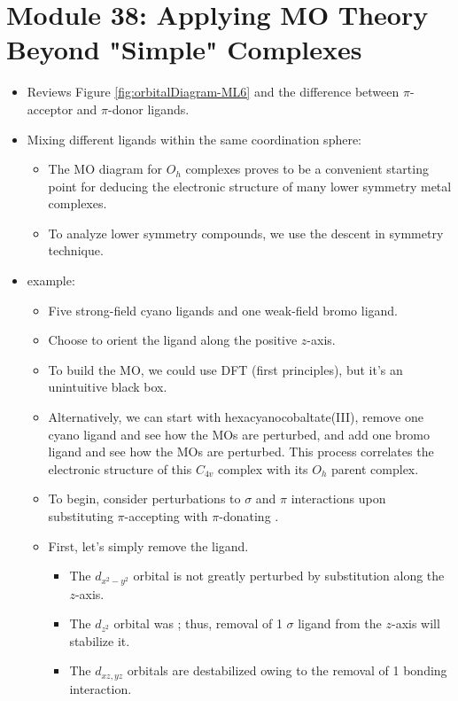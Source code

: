 \documentclass[../notes.tex]{subfiles}
\begin{document}
\section{Module 38: Applying MO Theory Beyond "Simple"  Complexes}
\begin{itemize}
    \item {}Reviews Figure \ref{fig:orbitalDiagram-ML6} and the difference between $\pi$-acceptor and $\pi$-donor ligands.
    \item Mixing different ligands within the same coordination sphere:
    \begin{itemize}
        \item The MO diagram for $O_h$ complexes proves to be a convenient starting point for deducing the electronic structure of many lower symmetry metal complexes.
        \item To analyze lower symmetry compounds, we use the descent in symmetry technique.
    \end{itemize}
    \item {} example:
    \begin{itemize}
        \item Five strong-field cyano ligands and one weak-field bromo ligand.
        \item Choose to orient the  ligand along the positive $z$-axis.
        \item To build the MO, we could use DFT (first principles), but it's an unintuitive black box.
        \item Alternatively, we can start with hexacyanocobaltate(III), remove one cyano ligand and see how the MOs are perturbed, and add one bromo ligand and see how the MOs are perturbed. This process correlates the electronic structure of this $C_{4v}$ complex with its $O_h$ parent complex.
        \item To begin, consider perturbations to $\sigma$ and $\pi$ interactions upon substituting $\pi$-accepting  with $\pi$-donating .
        \item First, let's simply remove the  ligand.
        \begin{itemize}
            \item The $d_{x^2-y^2}$ orbital is not greatly perturbed by substitution along the $z$-axis.
            \item The $d_{z^2}$ orbital was ; thus, removal of 1 $\sigma$ ligand from the $z$-axis will stabilize it.
            \item The $d_{xz,yz}$ orbitals are destabilized owing to the removal of 1  bonding interaction.

\end{itemize}
\end{itemize}
\end{itemize}
\end{document}
